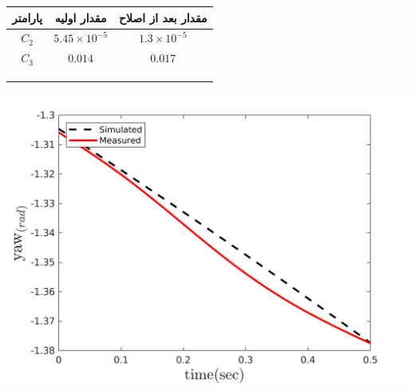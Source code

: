 \begin{minipage}[H]{\linewidth}
	\hfill
	\begin{minipage}[b]{0.49\linewidth}
		\centering
		\begin{tabular}{ccc}\hline
			پارامتر & مقدار اولیه  & مقدار بعد از اصلاح
			\\ \hline
			$C_2$  & $5.45\times10^{-5}$ & $1.3\times10^{-5}$ \\
			$C_3$  & $0.014$ & $0.017$ \\ \hline
			\\\\\\
		\end{tabular}
	\captionsetup{justification=centering}
	\end{minipage}
	\begin{minipage}[b]{0.48\linewidth}
		\centering
		\includegraphics[width=1\linewidth]{../Figures/RCP/yaw_parameter_estimation/RCP_yaw_S2.png}
		\captionsetup{justification=centering}
	\end{minipage}
\end{minipage}

